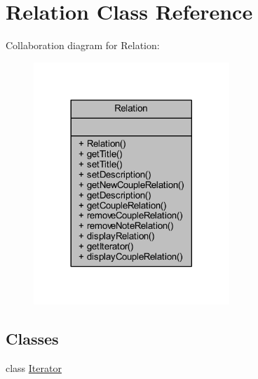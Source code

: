 \hypertarget{class_relation}{}\section{Relation Class Reference}
\label{class_relation}


Collaboration diagram for Relation\+:\nopagebreak
\begin{figure}[H]
\begin{center}
\leavevmode
\includegraphics[width=209pt]{class_relation__coll__graph}
\end{center}
\end{figure}
\subsection*{Classes}
\begin{DoxyCompactItemize}
\item 
class \hyperlink{class_relation_1_1_iterator}{Iterator}
\end{DoxyCompactItemize}
